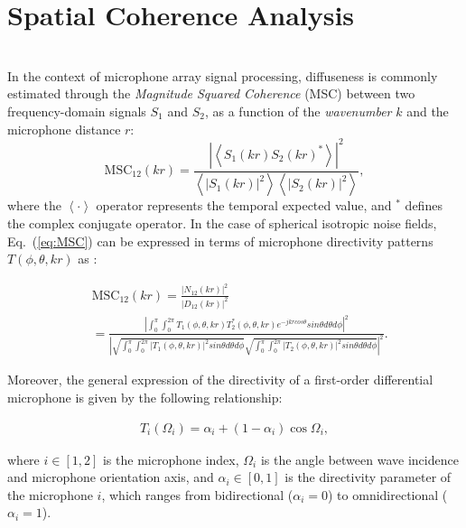 \section{Spatial Coherence Analysis}
\\


In the context of microphone array signal processing, diffuseness is commonly estimated through the
\textit{Magnitude Squared Coherence} (MSC) \cite{elko_spatial_2001} between two frequency-domain signals $S_1$ and $S_2$, as a function of the
\textit{wavenumber} $k$ and the microphone distance $r$:
\begin{equation}
    \text{MSC}_{12}(k r) =
	\frac{|\left\langle S_1(k r) S_2(k r)^* \right\rangle|^2}
	{\left\langle|S_1(k r)|^2\right\rangle \left\langle|S_2(k r)|^2\right\rangle},
    \label{eq:MSC}
\end{equation}
where the $\left\langle \cdot \right\rangle$ operator represents the temporal
expected value, and $^*$ defines the complex conjugate operator. In the case of spherical isotropic noise fields, Eq.~(\ref{eq:MSC})
can be expressed in terms of microphone directivity patterns
$T(\phi,\theta,k r)$ as \cite{elko_spatial_2001}:

\begin{equation}
	\begin{aligned}
&\text{MSC}_{12}(k r) = \frac{|N_{12}(k r)|^2}{|D_{12}(kr)|^2} \\
&= \frac{|\int_{0}^{\pi} \int_{0}^{2\pi} T_1(\phi,\theta,k r) T_2^*(\phi,\theta,k r) e^{-jk r cos\theta} sin\theta d\theta d\phi|^2}{|\sqrt{ \int_{0}^{\pi} \int_{0}^{2\pi} |T_1(\phi,\theta,k r)|^2 sin\theta d\theta d\phi } \sqrt{\int_{0}^{\pi} \int_{0}^{2\pi}|T_2(\phi,\theta,k r)|^2 sin\theta d\theta d\phi}|^2}.
\label{eq:MSCdir}
    \end{aligned}
\end{equation}


Moreover, the general expression of the directivity of a first-order differential microphone is given by the following relationship:

\begin{equation}
	\begin{aligned}
	T_i(\Omega_i) = \alpha_i + (1 - \alpha_i) \cos{\Omega_i},
	\end{aligned}
\end{equation}


where $i \in [1,2]$ is the microphone index, $\Omega_i$ is the angle between wave incidence and microphone orientation axis, and $\alpha_i \in [0,1]$ is the directivity parameter of the microphone $i$, which ranges from bidirectional ($\alpha_i = 0$) to omnidirectional ($\alpha_i = 1$). \\


